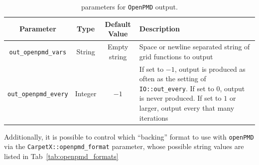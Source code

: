 \begin{table}[ht]
  \centering
  \begin{tabular*}{\textwidth}{cccp{23em}}
    Parameter                 & Type    & Default Value  & Description \\\hline\hline
    \texttt{out\_openpmd\_vars}  & String  & Empty string   & Space or newline separated string of grid functions to output \\
    \texttt{out\_openpmd\_every} & Integer & $-1$           & If set to $-1$, output is produced as often as the setting of \texttt{IO::out\_every}. If set to $0$, output is never produced. If set to $1$ or larger, output every that many iterations \\\hline\hline
  \end{tabular*}
  \label{tab:openpmd_params}
  \caption{\CarpetX\space parameters for \texttt{OpenPMD} output.}
\end{table}

Additionally, it is possible to control which ``backing'' format to use with \texttt{openPMD} via the \texttt{CarpetX::openpmd\_format} parameter, whose possible string values are listed in Tab~\ref{tab:openpmd_formats}

